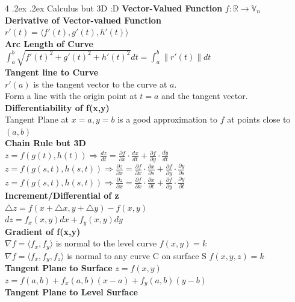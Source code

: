 \documentclass[10pt,landscape,a4paper]{article}
\makeatletter
\renewcommand{\section}{\@startsection{section}{1}{0mm}%
                                {.2ex}%
                                {.2ex}%
                                {\color{myblue}\sffamily\small\bfseries}}
\makeatother
\begin{document}
\begin{multicols*}{4}
\section{Calculus but 3D :D}
\textbf{Vector-Valued Function}
$f: \mathbb{R}\to\mathbb{V}_n$\\
\textbf{Derivative of Vector-valued Function}\\
$r'(t)=\langle f'(t),g'(t),h'(t)\rangle$\\
\textbf{Arc Length of Curve}\\
$\int_{a }^{b }\sqrt{f'(t)^2+g'(t)^2+h'(t)^2}dt=\int_{a }^{b }\|r'(t)\|dt$\\
\textbf{Tangent line to Curve}\\
$r'(a)$ is the tangent vector to the curve at $a$.\\
Form a line with the origin point at $t=a$ and the tangent vector.\\
\textbf{Differentiability of f(x,y)}\\
Tangent Plane at $x=a, y=b$ is a good approximation to $f$ at points close to $(a,b)$\\
\textbf{Chain Rule but 3D}\\
$z=f(g(t),h(t))\Rightarrow\frac{dz}{dt}=\frac{\partial f }{\partial x}\cdot\frac{dx}{dt}+\frac{\partial f}{\partial y}\cdot\frac{dy}{dt}$\\
$z=f(g(s,t),h(s,t))\Rightarrow\frac{\partial z}{\partial x}=\frac{\partial f }{\partial x}\cdot\frac{\partial x}{\partial s }+\frac{\partial f }{\partial y}\cdot\frac{\partial y}{\partial s}$\\
$z=f(g(s,t),h(s,t))\Rightarrow\frac{\partial z}{\partial x}=\frac{\partial f }{\partial x}\cdot\frac{\partial x}{\partial t}+\frac{\partial f }{\partial y}\cdot\frac{\partial y}{\partial t}$\\
\textbf{Increment/Differential of z}\\
$\triangle z=f(x+\triangle x, y+\triangle y)-f(x,y)$\\
$dz=f_x(x,y)dx+f_y(x,y)dy$\\
\textbf{Gradient of f(x,y)}\\
$\nabla f=\langle f_x,f_y\rangle$ is normal to the level curve $f(x,y)=k$\\
$\nabla f=\langle f_x,f_y,f_z\rangle$ is normal to any curve C on surface S $f(x,y,z)=k$\\
\textbf{Tangent Plane to Surface} $z=f(x,y)$\\
$z=f(a,b)+f_x(a,b)(x-a)+f_y(a,b)(y-b)$\\
\textbf{Tangent Plane to Level Surface}\\

\end{multicols*}
\end{document}

